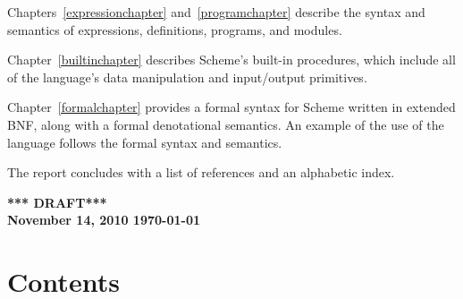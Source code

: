 \vest Chapters~\ref{expressionchapter} and~\ref{programchapter} describe
the syntax and semantics of expressions, definitions, programs, and modules.

\vest Chapter~\ref{builtinchapter} describes Scheme's built-in
procedures, which include all of the language's data manipulation and
input/output primitives.

\vest Chapter~\ref{formalchapter} provides a formal syntax for Scheme
written in extended BNF, along with a formal denotational semantics.
An example of the use of the language follows the formal syntax and
semantics.

\vest The report concludes with a list of references and an
alphabetic index.


\vfill
\begin{center}
{\large \bf
*** DRAFT*** \\
November 14, 2010
\today
}\end{center}

\vfill
\eject

\chapter*{Contents}
\addvspace{3.5pt}                  %
\renewcommand{\tocshrink}{-3.5pt}  %
{\footnotesize
\tableofcontents
}

\vfill
\eject
